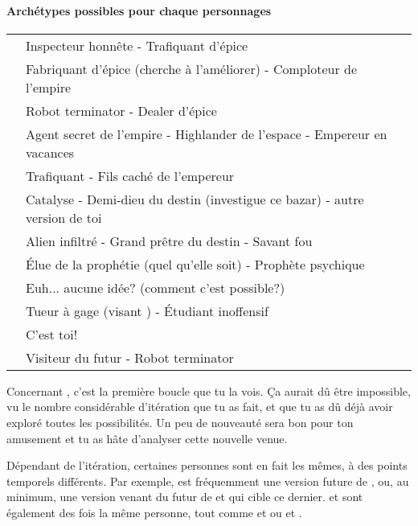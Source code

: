 {	\paragraph{Archétypes possibles pour chaque personnages}
	\begin{center}
	\begin{tabular}{|l||l|}
		\hline
		\emph{\nmPlayerVII} & Inspecteur honnête - Trafiquant d'épice\\
		\emph{\nmPlayerXII} & Fabriquant d'épice (cherche à l'améliorer) - Comploteur de l'empire\\
		\emph{\nmPlayerVIII} & Robot terminator - Dealer d'épice\\
		\emph{\nmPlayerX} & Agent secret de l'empire - Highlander de l'espace - Empereur en vacances\\
		\emph{\nmPlayerII} & Trafiquant - Fils caché de l'empereur\\
		\emph{\nmPlayerXI} & Catalyse - Demi-dieu du destin (investigue ce bazar) - autre version de toi\\
		\emph{\nmPlayerI} & Alien infiltré - Grand prêtre du destin - Savant fou\\
		\emph{\nmPlayerIX} & Élue de la prophétie (quel qu'elle soit) - Prophète psychique\\
		\emph{\nmPlayerVI} & Euh... aucune idée? (comment c'est possible?)\\
		\emph{\nmPlayerIII} & Tueur à gage (visant \nmPlayerX) - Étudiant inoffensif\\
		\emph{\nmPlayerIV} & C'est toi!\\
		\emph{\nmPlayerV} & Visiteur du futur - Robot terminator\\
		\hline
	\end{tabular}
	\end{center}
	\par Concernant \nmPlayerVI, c'est la première boucle que tu la vois. Ça aurait dû être impossible, vu le nombre considérable d'itération que tu as fait, et que tu as dû déjà avoir exploré toutes les possibilités. Un peu de nouveauté sera bon pour ton amusement et tu as hâte d'analyser cette nouvelle venue.
	
	\par Dépendant de l'itération, certaines personnes sont en fait les mêmes, à des points temporels différents. Par exemple, \nmPlayerV est fréquemment une version future de \nmPlayerVII, ou, au minimum, une version venant du futur de \nmPlayerVII et qui cible ce dernier. \nmPlayerII et \nmPlayerIII sont également des fois la même personne, tout comme \nmPlayerX et \nmPlayerVIII ou \nmPlayerXII et \nmPlayerIII.
	
}
